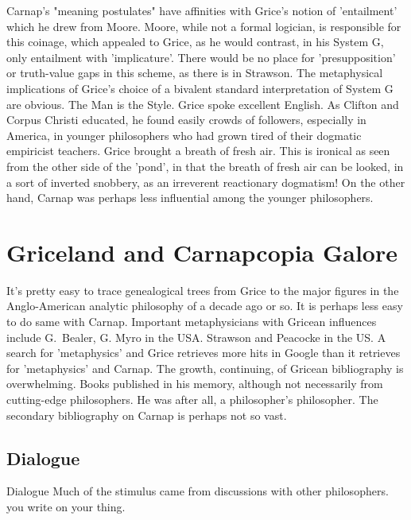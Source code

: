 \documentclass[10pt,titlepage]{book}
\begin{document}
Carnap's "meaning postulates" have affinities with Grice's notion  of 'entailment' which he drew from Moore.
Moore, while not a formal logician, is responsible for this coinage, which appealed to Grice, as he would contrast, in his System G, only entailment with 'implicature'. 
There would be no place for 'presupposition' or truth-value gaps in this scheme, as there is in Strawson.
The metaphysical implications of Grice's choice of a bivalent standard interpretation of System G are obvious. 
The  Man is the Style.
Grice spoke excellent English.
As Clifton and Corpus Christi educated, he found easily crowds of followers, especially in America, in younger philosophers who had grown tired of their dogmatic empiricist teachers.
Grice brought a breath of fresh air.
This is ironical as seen from the other side of  the 'pond', in that the breath of fresh air can be looked, in a sort of inverted snobbery, as an irreverent reactionary dogmatism!
On the other hand, Carnap was perhaps less influential among the younger philosophers.   

\section{Griceland and Carnapcopia Galore}

It's pretty easy to trace genealogical trees from Grice to the major figures in the Anglo-American analytic philosophy of a decade ago or so.
It is perhaps less easy to do same with Carnap.
Important metaphysicians with Gricean influences include G.~Bealer, G. Myro 
in the USA. Strawson and  Peacocke in the US. A search for 'metaphysics' 
and Grice retrieves more hits in  Google than it retrieves for 'metaphysics' 
and Carnap. The growth, continuing,  of Gricean bibliography is overwhelming. 
Books published in his memory, although  not necessarily from cutting-edge 
philosophers. He was after all, a  philosopher's philosopher. The secondary 
bibliography on Carnap is perhaps not  so vast. 
 
\subsection{Dialogue}

Dialogue
Much of the stimulus came from discussions with other  philosophers.
you write on your thing.
 
\end{document}
